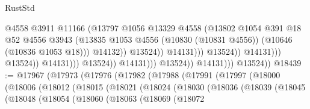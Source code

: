 \begin{lexlean}{RustStd}
\begin{coremodule}
                                                          @4558
                                                          @3911
                                                          @11166
                                                          (@13797
                                                            @1056
                                                            @13329
                                                            @4558
                                                            (@13802
                                                              @1054
                                                              @391
                                                              @18
                                                              @52
                                                              @4556
                                                              @3943
                                                              (@13835
                                                                @1053
                                                                @4556
                                                                (@10830 (@10831 @4556))
                                                                (@10646 (@10836 @1053 @18)))
                                                              @14132))
                                                          @13524))
                                                      @14131)))
                                                @13524))
                                            @14131)))
                                      @13524))
                                  @14131)))
                            @13524))
                        @14131)))
                  @13524))
              @14131)))
        @13524))
@18439 := @17967
    (@17973
      (@17976
        (@17982
          (@17988
            (@17991
              (@17997
                (@18000
                  (@18006
                    (@18012
                      (@18015
                        (@18021
                          (@18024
                            (@18030
                              (@18036
                                (@18039
                                  (@18045
                                    (@18048
                                      (@18054
                                        (@18060
                                          (@18063
                                            (@18069
                                              (@18072

\end{coremodule}
\end{lexlean}
